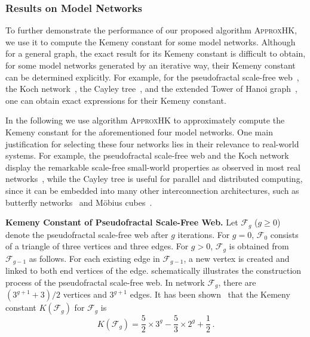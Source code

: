 \documentclass[10pt,twocolumn,twoside]{IEEEtran}
\begin{document}
\subsubsection{Results on Model Networks}

To further demonstrate the performance of our proposed algorithm \textsc{ApproxHK}, we use it to compute the Kemeny constant for some model networks.  Although for a general graph, the exact result for its  Kemeny constant is difficult to obtain, for some model networks generated by an iterative way, their Kemeny constant can be determined explicitly.
For example, for the pseudofractal scale-free web~\cite{XiZhCo16,ShLiZh17}, the Koch network~\cite{XiLiZh15}, the Cayley tree~\cite{CaCh97,ChCa99}, and the extended Tower of Hanoi graph~\cite{KlMo05}, one can obtain exact expressions for their Kemeny constant.

In the following we use algorithm \textsc{ApproxHK} to approximately compute the Kemeny constant for the aforementioned four model networks. One main justification for selecting  these four networks lies in their relevance to real-world systems. For example,  the pseudofractal scale-free web and the Koch network display the remarkable scale-free small-world properties as observed in most real networks~\cite{Ne03}, while the Cayley tree is useful for parallel and distributed computing, since it can be embedded into many other interconnection architectures, such as butterfly networks~\cite{GuHa91} and M{\"o}bius cubes~\cite{LiFaJi16}.



\textbf{Kemeny Constant of Pseudofractal Scale-Free Web.} Let \(\mathcal{F}_g\) (\(g \geq 0\)) denote the pseudofractal scale-free web after \(g\) iterations. For \(g=0\), \( \mathcal{F}_0\) consists of a triangle of three vertices and three edges. For \(g>0\), \(\mathcal{F}_g\) is obtained from \(\mathcal{F}_{g-1}\) as follows. For each existing edge in \(\mathcal{F}_{g-1}\), a new vertex is created and linked to both end vertices of the edge.   schematically illustrates the construction process of the pseudofractal scale-free web. In network \(\mathcal{F}_g\), there are \((3^{g+1}+3)/2\) vertices and \(3^{g+1}\) edges.  It has been shown~\cite{XiZhCo16} that the Kemeny constant \(K(\mathcal{F}_g) \) for \(\mathcal{F}_g\) is
\begin{equation}\label{Kg01}
    K(\mathcal{F}_g)=\frac{5}{2}\times3^g-\frac{5}{3}\times2^g+\frac{1}{2}\,. %
\end{equation}
\end{document}
